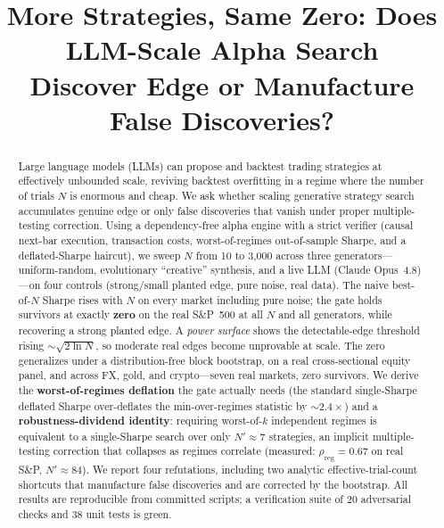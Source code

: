 \documentclass[conference]{IEEEtran}
\begin{document}
\title{More Strategies, Same Zero: Does LLM-Scale Alpha Search\\
Discover Edge or Manufacture False Discoveries?}

\author{
}

\maketitle

\begin{abstract}
Large language models (LLMs) can propose and backtest trading strategies at effectively
unbounded scale, reviving backtest overfitting in a regime where the number of trials $N$ is
enormous and cheap. We ask whether scaling generative strategy search accumulates genuine
edge or only false discoveries that vanish under proper multiple-testing correction. Using a
dependency-free alpha engine with a strict verifier (causal next-bar execution, transaction
costs, worst-of-regimes out-of-sample Sharpe, and a deflated-Sharpe haircut), we sweep $N$
from 10 to 3{,}000 across three generators---uniform-random, evolutionary ``creative''
synthesis, and a live LLM (Claude Opus~4.8)---on four controls (strong/small planted edge,
pure noise, real data). The naive best-of-$N$ Sharpe rises with $N$ on every market including
pure noise; the gate holds survivors at exactly \textbf{zero} on the real S\&P~500 at all $N$
and all generators, while recovering a strong planted edge. A \emph{power surface} shows the
detectable-edge threshold rising $\sim\!\sqrt{2\ln N}$, so moderate real edges become
unprovable at scale. The zero generalizes under a distribution-free block bootstrap, on a
real cross-sectional equity panel, and across FX, gold, and crypto---seven real markets, zero
survivors. We derive the \textbf{worst-of-regimes deflation} the gate actually needs (the
standard single-Sharpe deflated Sharpe over-deflates the min-over-regimes statistic by
$\sim\!2.4\times$) and a \textbf{robustness-dividend identity}: requiring worst-of-$k$
independent regimes is equivalent to a single-Sharpe search over only $N'\!\approx\!7$
strategies, an implicit multiple-testing correction that collapses as regimes correlate
(measured: $\rho_\mathrm{reg}\!=\!0.67$ on real S\&P, $N'\!\approx\!84$). We report four
refutations, including two analytic effective-trial-count shortcuts that manufacture false
discoveries and are corrected by the bootstrap. All results are reproducible from committed
scripts; a verification suite of 20 adversarial checks and 38 unit tests is green.
\end{abstract}
\end{document}
